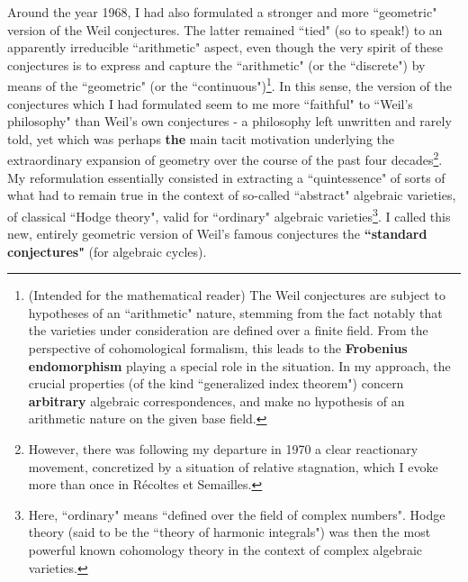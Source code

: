 Around the year 1968, I had also formulated a stronger and more ``geometric" version of the Weil conjectures. The latter remained ``tied" (so to speak!) to an apparently irreducible ``arithmetic" aspect, even though the very spirit of these conjectures is to express and capture the ``arithmetic" (or the ``discrete") by means of the ``geometric" (or the ``continuous")\footnote{(Intended for the mathematical reader) The Weil conjectures are subject to hypotheses of an ``arithmetic" nature, stemming from the fact notably that the varieties under consideration are defined over a finite field. From the perspective of cohomological formalism, this leads to the \textbf{Frobenius endomorphism} playing a special role in the situation. In my approach, the crucial properties (of the kind ``generalized index theorem") concern \textbf{arbitrary} algebraic correspondences, and make no hypothesis of an arithmetic nature on the given base field.}. In this sense, the version of the conjectures which I had formulated seem to me more ``faithful" to ``Weil's philosophy" than Weil's own conjectures - a philosophy left unwritten and rarely told, yet which was perhaps \textbf{the} main tacit motivation underlying the extraordinary expansion of geometry over the course of the past four decades\footnote{However, there was following my departure in 1970 a clear reactionary movement, concretized by a situation of relative stagnation, which I evoke more than once in R\'ecoltes et Semailles.}. My reformulation essentially consisted in extracting a ``quintessence" of sorts of what had to remain true in the context of so-called ``abstract" algebraic varieties, of classical ``Hodge theory", valid for ``ordinary" algebraic varieties\footnote{Here, ``ordinary" means ``defined over the field of complex numbers". Hodge theory (said to be the ``theory of harmonic integrals") was then the most powerful known cohomology theory in the context of complex algebraic varieties.}. I called this new, entirely geometric version of Weil's famous conjectures the \textbf{``standard conjectures"} (for algebraic cycles).

